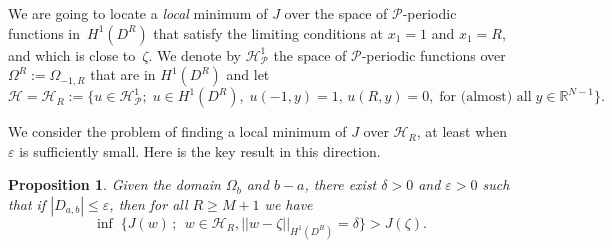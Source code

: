 \documentclass[a4paper,12pt,fullpage]{article}
\numberwithin{equation}{section}
\newtheorem{Prop}[Lemma]{Proposition}
\def\R{{\mathbb R}}
\def\ep{\varepsilon}
\begin{document}
We are going to locate a {\em local} minimum of $J$ over the space of ${\mathcal P}$-periodic functions in~$H^1(D^R)$ that satisfy the limiting conditions at $x_1= 1$ and $x_1= R$, and which is close to~$\zeta$. We denote by ${\mathcal H}^1_{\mathcal P}$ the space of ${\mathcal P}$-periodic functions over $\Omega^R := \Omega_{-1, R}$ that are in $H^1(D^R)$ and let
\[
{\mathcal H}={\mathcal H}_R := \{ u \in {\mathcal H}^1_{\mathcal P} ; \;  u\in H^1(D^R) ,\;
u(-1, y) = 1, \, u(R,y) = 0, \;\text{for (almost) all} \; y\in\R^{N-1} \}.
\]

We consider the problem of finding a local minimum of $J$ over ${\mathcal H}_R$, at least when $\ep$ is sufficiently small. Here is the key result in this direction. 

\begin{Prop}\label{locmin}
Given the domain $\Omega_b$ and $b-a$, there exist $\delta >0$ and $\ep>0$ such that if $|D_{a,b}| \leq \ep$, then for all $R\geq M+1$ we have 
\[
\inf \; \{J(w) \, ; \;\, w\in{\mathcal H}_R, || w - \zeta ||_{H^1(D^R)} = \delta \} > J(\zeta).
\]
\end{Prop}
\end{document}

